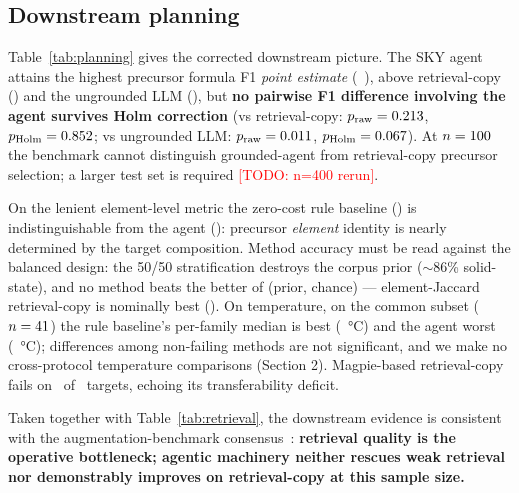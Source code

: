 \documentclass[10pt]{article}
\newcommand{\todo}[1]{\textcolor{red}{[TODO: #1]}}
\begin{document}
\subsection{Downstream planning}

\begin{table}[t]
  \centering
  \caption{Planning benchmark on \nPlanningCases\ held-out targets.
  Precursor metrics as mean [95\% CI]. Cov.\ = fraction of cases with a
  scoreable temperature prediction.}
  \label{tab:planning}
  
\end{table}

Table~\ref{tab:planning} gives the corrected downstream picture. The SKY
agent attains the highest precursor formula F1 \emph{point estimate}
(\skyFOne\ \skyFOneCI), above retrieval-copy (\retrJaccFOne) and the
ungrounded LLM (\llmFOne), but \textbf{no pairwise F1 difference involving
the agent survives Holm correction} (vs retrieval-copy:
$p_{\mathrm{raw}}=0.213$,
$p_{\mathrm{Holm}}=0.852$; vs ungrounded LLM:
$p_{\mathrm{raw}}=0.011$,
$p_{\mathrm{Holm}}=0.067$). At $n=100$ the
benchmark cannot distinguish grounded-agent from retrieval-copy precursor
selection; a larger test set is required \todo{n=400 rerun}.

On the lenient element-level metric the zero-cost rule baseline
() is indistinguishable from the agent (\skyElemJacc):
precursor \emph{element} identity is nearly determined by the target
composition. Method accuracy must be read against the balanced design:
the 50/50 stratification destroys the corpus prior ($\sim$86\%
solid-state), and no method beats the better of (prior, chance) ---
element-Jaccard retrieval-copy is nominally best (\retrJaccMethodAcc).
On temperature, on the common subset ($n=41$) the rule
baseline's per-family median is best (~\si{\celsius})
and the agent worst (\skyTempMaeCommon~\si{\celsius}); differences among
non-failing methods are not significant, and we make no cross-protocol
temperature comparisons (Section 2). Magpie-based retrieval-copy fails on
\retrMagpieFailures\ of \nPlanningCases\ targets, echoing its
transferability deficit.

Taken together with Table~\ref{tab:retrieval}, the downstream evidence is
consistent with the augmentation-benchmark consensus~\cite{iclr2026benchmark}:
\textbf{retrieval quality is the operative bottleneck; agentic machinery
neither rescues weak retrieval nor demonstrably improves on
retrieval-copy at this sample size.}
\end{document}
